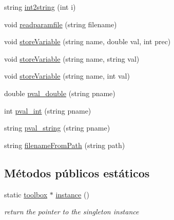 \begin{DoxyCompactItemize}
\item 
string \hyperlink{classtoolbox_a4b2268cb178f0ae934f46efffda0450b}{int2string} (int i)
\item 
void \hyperlink{classtoolbox_a2b7ddff386b9bc1f790627f632fae50c}{readparamfile} (string filename)
\item 
void \hyperlink{classtoolbox_a05d6f98094e98e263806b9c7b51fac51}{store\+Variable} (string name, double val, int prec)
\item 
void \hyperlink{classtoolbox_a8f04e33d10ffe547856ded0caf3d5640}{store\+Variable} (string name, string val)
\item 
void \hyperlink{classtoolbox_a53685118cae82122f3a0d083185804b3}{store\+Variable} (string name, int val)
\item 
double \hyperlink{classtoolbox_aa6cb1dff126daa9c34d6e2435143b372}{pval\+\_\+double} (string pname)
\item 
int \hyperlink{classtoolbox_a30135dd53233f8ed0cd68532f51cb002}{pval\+\_\+int} (string pname)
\item 
string \hyperlink{classtoolbox_ad3c9eb0127e47a8ce04922646ade51fc}{pval\+\_\+string} (string pname)
\item 
string \hyperlink{classtoolbox_a67d5356e65a3e93b179f0e48f98cf41c}{filename\+From\+Path} (string path)
\end{DoxyCompactItemize}
\subsection*{Métodos públicos estáticos}
\begin{DoxyCompactItemize}
\item 
\hypertarget{classtoolbox_a3058e36ea4c84178eaa21321a5733cc8}{static \hyperlink{classtoolbox}{toolbox} $\ast$ \hyperlink{classtoolbox_a3058e36ea4c84178eaa21321a5733cc8}{instance} ()}\label{classtoolbox_a3058e36ea4c84178eaa21321a5733cc8}

\begin{DoxyCompactList}\small\item\em return the pointer to the singleton instance \end{DoxyCompactList}\end{DoxyCompactItemize}
